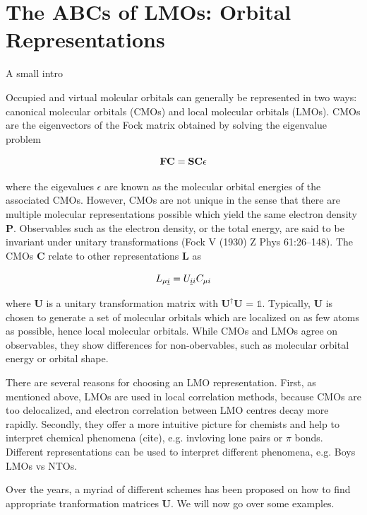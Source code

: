 \section{The ABCs of LMOs: Orbital Representations \label{sec:ABCLMO}}

A small intro


Occupied and virtual molcular orbitals can generally be represented in two ways: canonical molecular orbitals (CMOs) and local molecular orbitals (LMOs). CMOs are the eigenvectors of the Fock matrix obtained by solving the eigenvalue problem

\begin{equation}
\mathbf{F}\mathbf{C} = \mathbf{S}\mathbf{C} \epsilon
\end{equation}

where the eigevalues $\epsilon$ are known as the molecular orbital energies of the associated CMOs. However, CMOs are not unique in the sense that there are multiple molecular representations possible which yield the same electron density $\mathbf{P}$. Observables such as the electron density, or the total energy, are said to be invariant under unitary transformations (Fock V (1930) Z Phys 61:26–148). The CMOs $\mathbf{C}$ relate to other representations $\mathbf{L}$ as

\begin{equation}
L_{\mu \underline{i}} = U_{\underline{i} i} C_{\mu i}
\end{equation}

\noindent where $\mathbf{U}$ is a unitary transformation matrix with $\mathbf{U}^{\dagger} \mathbf{U}$ = $\mathbb{1}$. Typically, $\mathbf{U}$ is chosen to generate a set of molecular orbitals which are localized on as few atoms as possible, hence local molecular orbitals. While CMOs and LMOs agree on observables, they show differences for non-obervables, such as molecular orbital energy or orbital shape.

There are several reasons for choosing an LMO representation. First, as mentioned above, LMOs are used in local correlation methods, because CMOs are too delocalized, and electron correlation between LMO centres decay more rapidly. Secondly, they offer a more intuitive picture for chemists and help to interpret chemical phenomena (cite), e.g. invloving lone pairs or $\pi$ bonds. Different representations can be used to interpret different phenomena, e.g. Boys LMOs vs NTOs.

Over the years, a myriad of different schemes has been proposed on how to find appropriate tranformation matrices $\mathbf{U}$. We will now go over some examples.

